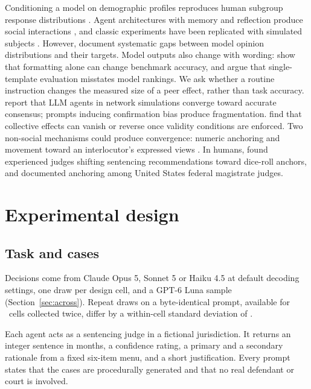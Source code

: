 \documentclass{article}
\begin{document}
Conditioning a model on demographic profiles reproduces human subgroup response distributions
\citep{argyle2023out,park2024thousand}. Agent architectures with memory and reflection produce
social interactions \citep{park2023generative}, and classic experiments have been
replicated with simulated subjects \citep{aher2023using,horton2023large}. However,
\citet{santurkar2023whose} document systematic gaps between model opinion distributions and their
targets. Model outputs also change with wording: \citet{sclar2024quantifying} show that formatting
alone can change benchmark accuracy, and \citet{mizrahi2024state} argue that single-template
evaluation misstates model rankings. We ask whether a routine instruction changes the measured size
of a peer effect, rather than task accuracy.
\citet{chuang2024simulating} report that LLM agents in network simulations converge toward accurate
consensus; prompts inducing confirmation bias produce fragmentation. \citet{zhou2025pimmur} find
that collective effects can vanish or reverse once validity
conditions are enforced. Two non-social mechanisms could produce convergence: numeric anchoring
\citep{jones2022capturing,echterhoff2024cognitive} and movement toward an interlocutor's expressed
views \citep{sharma2024sycophancy}. In humans, \citet{englich2006playing} found experienced judges
shifting sentencing recommendations toward dice-roll anchors, and \citet{guthrie2001inside}
documented anchoring among United States federal magistrate judges.

\section{Experimental design}

\subsection{Task and cases}

Decisions come from Claude Opus 5, Sonnet 5 or Haiku 4.5 at default decoding settings, one draw
per design cell, and a GPT-6 Luna sample (Section~\ref{sec:across}). Repeat draws on
a byte-identical prompt, available for \decCells\ cells collected twice, differ by a within-cell
standard deviation of \decSd.

Each agent acts as a sentencing judge in a fictional jurisdiction. It returns an integer sentence
in months, a confidence rating, a primary and a secondary rationale from a fixed six-item menu, and
a short justification. Every prompt states that the cases are procedurally generated and that no
real defendant or court is involved.
\end{document}
